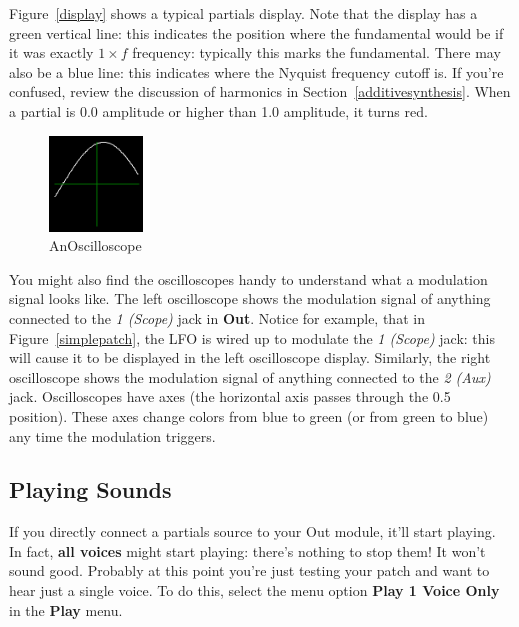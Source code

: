 \documentclass{article}
\begin{document}
Figure~\ref{display} shows a typical partials display.  Note that the display has a green vertical line: this indicates the position where the fundamental would be if it was exactly \(1\times f\) frequency: typically this marks the fundamental.  There may also be a blue line: this indicates where the Nyquist frequency cutoff is. If you're confused, review the discussion of harmonics in Section~\ref{additivesynthesis}.  When a partial is 0.0 amplitude or higher than 1.0 amplitude, it turns red.

\begin{figure}
\vspace{-1em}
\includegraphics[height=1in]{oscilloscope}
\caption{An\newline Oscilloscope}
\vspace{-2em}
\label{oscilloscope}
\end{figure}

You might also find the oscilloscopes handy to understand what a modulation signal looks like.  The left oscilloscope shows the modulation signal of anything connected to the {\it 1 (Scope)} jack in {\bf Out}.  Notice for example, that in Figure~\ref{simplepatch}, the LFO is wired up to modulate the {\it 1 (Scope)} jack: this will cause it to be displayed in the left oscilloscope display.  Similarly, the right oscilloscope shows the modulation signal of anything connected to the {\it 2 (Aux)} jack.  Oscilloscopes have axes (the horizontal axis passes through the 0.5 position).  These axes change colors from blue to green (or from green to blue) any time the modulation triggers.

\subsection{Playing Sounds}

If you directly connect a partials source to your Out module, it'll start playing.  In fact, {\bf all voices} might start playing: there's nothing to stop them!  It won't sound good.   Probably at this point you're just testing your patch and want to hear just a single voice.  To do this, select the menu option {\bf Play 1 Voice Only} in the {\bf Play} menu.
\end{document}
